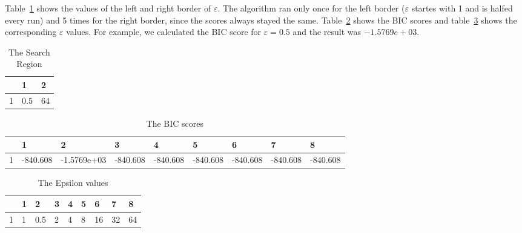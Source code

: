 \documentclass[
a4paper,
12pt
]{scrartcl}
\newcommand{\gray}{\cellcolor{grayself}}  %
\begin{document}
Table~\ref{table:region} shows the values of the left and right border of $\varepsilon$. The algorithm ran only once for the left border ($\varepsilon$ startes with 1 and is halfed every run) and 5 times for the right border, since the scores always stayed the same. Table~\ref{table:bicscores} shows the BIC scores and table~\ref{table:epsilonvalues} shows the corresponding $\varepsilon$ values. For example, we calculated the BIC score for $\varepsilon = 0.5$ and the result was $-1.5769e+03$.

\begin{table}[ht!]
\centering
\begin{tabular}{|l|l|l|}
\hline
\gray &\gray 1 & \gray 2 \\ \hline
\gray 1&0.5 & 64 \\ \hline
\end{tabular}
\caption{The Search Region}
\label{table:region}
\end{table}

\begin{table}[ht!]
\centering
\begin{tabular}{|l|l|l|l|l|l|l|l|l|}
\hline
\gray &\gray 1 & \gray 2 & \gray 3 & \gray 4 & \gray 5 & \gray 6 & \gray 7 & \gray 8 \\ \hline
\gray 1&-840.608 & -1.5769e+03 & -840.608 & -840.608 & -840.608 & -840.608 & -840.608 & -840.608 \\ \hline
\end{tabular}
\caption{The BIC scores}
\label{table:bicscores}
\end{table}

\begin{table}[ht!]
\centering
\begin{tabular}{|l|l|l|l|l|l|l|l|l|}
\hline
\gray &\gray 1 & \gray 2 & \gray 3 & \gray 4 & \gray 5 & \gray 6 & \gray 7 & \gray 8 \\ \hline
\gray 1&1 & 0.5 & 2 & 4 & 8 & 16 & 32 & 64 \\ \hline
\end{tabular}
\caption{The Epsilon values}
\label{table:epsilonvalues}
\end{table}
\end{document}
